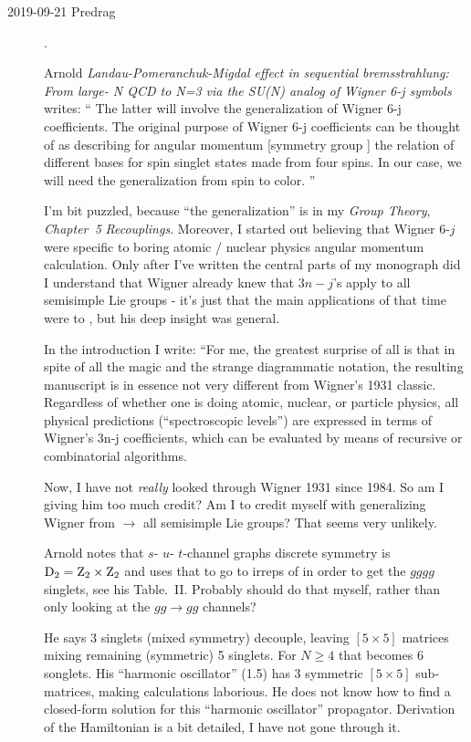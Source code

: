 \begin{description}
\item[2019-09-21  Predrag].

Arnold {\em {Landau-Pomeranchuk-Migdal} effect in sequential
bremsstrahlung: {From large- N {QCD} to N=3} via the {SU}(N) analog of
{Wigner }6-j symbols} writes:
``
The latter will involve the  generalization of Wigner 6-j
coefficients. The original purpose of Wigner 6-j coefficients can be
thought of as describing for angular momentum [symmetry group ]
the relation of different bases for spin singlet states made from four
spins. In our case, we will need the generalization from spin to color.
''

I'm bit puzzled, because ``the generalization'' is in my \emph{Group
Theory},
 {\em
Chapter~5} {\em Recouplings}. Moreover, I started out believing that
Wigner 6-$j$ were specific to  boring atomic / nuclear physics angular
momentum calculation. Only after I've written the central parts of my
monograph did I understand that Wigner already knew that $3n-j$'s apply
to all semisimple Lie groups - it's just that the main applications of
that time were to , but his deep insight was general.

In the introduction I write:
``For me, the greatest surprise of all is that in spite of all the magic
and the strange diagrammatic notation, the resulting manuscript is in
essence not very different from Wigner's 1931 classic. Regardless of
whether one is doing atomic, nuclear, or particle physics, all physical
predictions (``spectroscopic levels'') are expressed in terms of
Wigner's 3n-j coefficients, which can be evaluated by means of recursive or
combinatorial algorithms.

Now, I have not {\em really} looked through Wigner 1931 since 1984. So am
I giving him too much credit? Am I to credit myself with generalizing
Wigner from  $\to$ all semisimple Lie groups? That seems very
unlikely.

Arnold notes that $s$- $u$- $t$-channel graphs discrete symmetry is
$\textrm{D}_{2}=\textrm{Z}_{2}\times\textrm{Z}_{2}$ and uses that to go to irreps of  in
order to get the $gggg$ singlets, see his Table.~II.
Probably should do that myself, rather
than only looking at the $gg\to{gg}$ channels?

He says 3 singlets (mixed symmetry) decouple, leaving $[5\!\times\!5]$
matrices mixing remaining (symmetric) 5 singlets. For $N\geq4$ that
becomes 6 songlets. His ``harmonic oscillator'' (1.5) has 3 symmetric
$[5\!\times\!5]$ sub-matrices, making calculations laborious. He does not
know how to find a closed-form solution for this ``harmonic oscillator''
propagator. Derivation of the Hamiltonian is a bit detailed, I have not
gone through it.


\end{description}


\printbibliography[heading=subbibintoc,title={References}]
